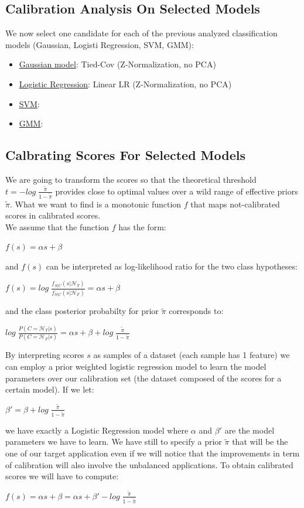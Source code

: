 \documentclass[10pt, a4paper, twocolumn]{article} %
\begin{document}
\subsection{Calibration Analysis On Selected Models}
We now select one candidate for each of the previous analyzed classification models (Gaussian, Logisti Regression,
SVM, GMM):
\begin{itemize}
	\item \underline{Gaussian model}: Tied-Cov (Z-Normalization, no PCA)
	\item \underline{Logistic Regression}: Linear LR (Z-Normalization, no PCA)
	\item \underline{SVM}: 
	\item \underline{GMM}:
\end{itemize}
\subsection{Calbrating Scores For Selected Models}
We are going to transform the scores so that the theoretical threshold $t = -log\;\frac{\tilde{\pi}}{1-\tilde{\pi}}$
provides close to optimal values over a wild range of effective priors $\tilde{\pi}$. What we want to find is a 
monotonic function $f$ that maps not-calibrated scores in calibrated scores.\\
We assume that the function $f$ has the form:
\begin{center}
	$f(s) = \alpha s + \beta$
\end{center}
and $f(s)$ can be interpreted as log-likelihood ratio for the two class hypotheses:
\begin{center}
	$f(s) = log\;\frac{f_{S|C}(s|\mathcal{H}_T)}{f_{S|C}(s|\mathcal{H}_F)} = \alpha s + \beta$
\end{center}
and the class posterior probabilty for prior $\tilde{\pi}$ corresponds to:
\begin{center}
	$log\;\frac{P(C=\mathcal{H}_T|s)}{P(C=\mathcal{H}_F|s)} = \alpha s + \beta + log\;\frac{\tilde{\pi}}{1-\tilde{\pi}}$
\end{center}
By interpreting scores $s$ as samples of a dataset (each sample has 1 feature) we can employ a prior weighted
logistic regression model to learn the model parameters over our calibration set (the dataset composed of the
scores for a certain model). If we let:
\begin{center}
	$\beta' = \beta + log\;\frac{\tilde{\pi}}{1-\tilde{\pi}}$
\end{center}
we have exactly a Logistic Regression model where $\alpha$ and $\beta'$ are the model parameters we have to learn.
We have still to specify a prior $\tilde{\pi}$ that will be the one of our target application even if we will notice
that the improvements in term of calibration will also involve the unbalanced applications. To obtain calibrated
scores we will have to compute:
\begin{center}
	$f(s) = \alpha s + \beta = \alpha s + \beta' - log\;\frac{\tilde{\pi}}{1-\tilde{\pi}}$
\end{center}
\end{document}
